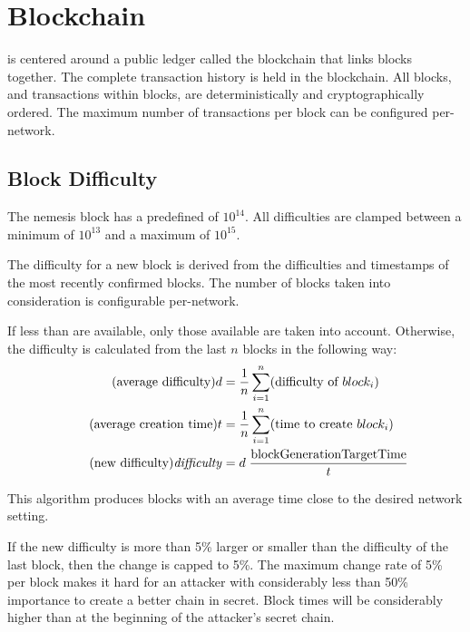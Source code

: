 \section{Blockchain}
\label{sec:blockchain}


\codenamespace is centered around a public ledger called the blockchain that links blocks together.
The complete transaction history is held in the blockchain.
All blocks, and transactions within blocks, are deterministically and cryptographically ordered.
The maximum number of transactions per block can be configured per-network.

\subsection{Block Difficulty}
\label{sec:blockchain:difficulty}

The nemesis block has a predefined  of $10^{14}$.
All difficulties are clamped between a minimum of $10^{13}$ and a maximum of $10^{15}$.

The difficulty for a new block is derived from the difficulties and timestamps of the most recently confirmed blocks.
The number of blocks taken into consideration is configurable per-network.

If less than  are available, only those available are taken into account.
Otherwise, the difficulty is calculated from the last $n$ blocks in the following way:
\begin{align*}
\tag{average difficulty} d &= \frac{1}{n}\sum_{i=1}^n (\text{difficulty of $block_i$}) \\
\tag{average creation time} t &= \frac{1}{n}\sum_{i=1}^n (\text{time to create $block_i$}) \\
\tag{new difficulty} \mathvar{difficulty} &= d \; \frac{\nemsetting{network}{blockGenerationTargetTime}}{t}
\end{align*}

This algorithm produces blocks with an average time close to the desired  network setting.

If the new difficulty is more than 5\% larger or smaller than the difficulty of the last block, then the change is capped to 5\%.
The maximum change rate of 5\% per block makes it hard for an attacker with considerably less than 50\% importance to create a better chain in secret.
Block times will be considerably higher than  at the beginning of the attacker's secret chain.

